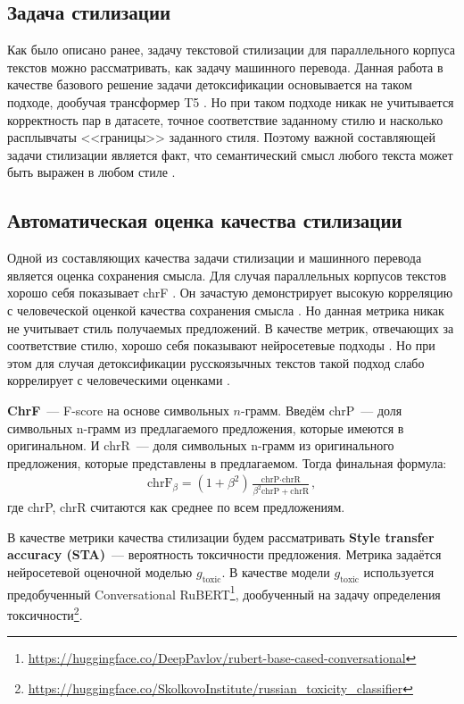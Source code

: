 \subsection{Задача стилизации}

Как было описано ранее, задачу текстовой стилизации для параллельного корпуса текстов можно рассматривать, как задачу машинного перевода. 
Данная работа в качестве базового решение задачи детоксификации основывается на таком подходе, дообучая трансформер T5 \cite{t5}.
Но при таком подходе никак не учитывается корректность пар в датасете, точное соответствие заданному стилю и насколько расплывчаты <<границы>> заданного стиля.
Поэтому важной составляющей задачи стилизации является факт, что семантический смысл любого текста может быть выражен в любом стиле \cite{Tikhonov2018WhatIW}.   

\subsection{Автоматическая оценка качества стилизации}
\label{section:autoeval}
Одной из составляющих качества задачи стилизации и машинного перевода является оценка сохранения смысла. 
Для случая параллельных корпусов текстов хорошо себя показывает chrF \cite{popovic-2015-chrf}.
Он зачастую демонстрирует высокую корреляцию с человеческой оценкой качества сохранения смысла \cite{briakou-etal-2021-evaluating, logacheva-etal-2022-study}. 
Но данная метрика никак не учитывает стиль получаемых предложений.
В качестве метрик, отвечающих за соответствие стилю, хорошо себя показывают нейросетевые подходы \cite{briakou-etal-2021-evaluating}. 
Но при этом для случая детоксификации русскоязычных текстов такой подход слабо коррелирует с человеческими оценками \cite{logacheva-etal-2022-study}.

\textbf{ChrF}~--- F-score на основе символьных $n$-грамм.
Введём chrP~--- доля символьных n-грамм из предлагаемого предложения, которые имеются в оригинальном.
И chrR~--- доля символьных n-грамм из оригинального предложения, которые представлены в предлагаемом. 
Тогда финальная формула:
\begin{gather*}
    \text{chrF}_{\beta} = (1 + \beta^2) \frac{\text{chrP} \cdot \text{chrR}}{\beta^2 \text{chrP} + \text{chrR}},
\end{gather*}
где chrP, chrR считаются как среднее по всем предложениям. 

В качестве метрики качества стилизации будем рассматривать \textbf{Style transfer accuracy (STA)}~--- вероятность токсичности предложения.
Метрика задаётся нейросетевой оценочной моделью $g_{\text{toxic}}$.
В качестве модели $g_{\text{toxic}}$ используется предобученный Conversational RuBERT\footnote{\url{https://huggingface.co/DeepPavlov/rubert-base-cased-conversational}}, дообученный на задачу определения токсичности\footnote{\url{https://huggingface.co/SkolkovoInstitute/russian_toxicity_classifier}}. 


